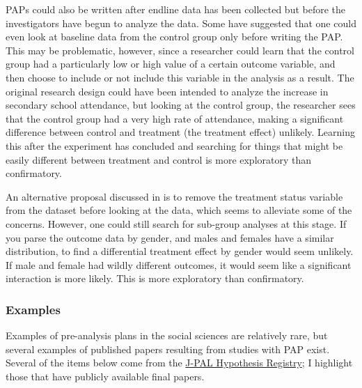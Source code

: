 \documentclass[12pt] {article}
\begin{document}
PAPs could also be written after endline data has been collected but before the investigators have begun to analyze the data. Some have suggested that one could even look at baseline data from the control group only before writing the PAP. This may be problematic, however, since a researcher could learn that the control group had a particularly low or high value of a certain outcome variable, and then choose to include or not include this variable in the analysis as a result. The original research design could have been intended to analyze the increase in secondary school attendance, but looking at the control group, the researcher sees that the control group had a very high rate of attendance, making a significant difference between control and treatment (the treatment effect) unlikely. Learning this after the experiment has concluded and searching for things that might be easily different between treatment and control is more exploratory than confirmatory. 

An alternative proposal discussed in \cite{OlkenPAP} is to remove the treatment status variable from the dataset before looking at the data, which seems to alleviate some of the concerns. However, one could still search for sub-group analyses at this stage. If you parse the outcome data by gender, and males and females have a similar distribution, to find a differential treatment effect by gender would seem unlikely. If male and female had wildly different outcomes, it would seem like a significant interaction is more likely. This is more exploratory than confirmatory. 


\subsubsection{Examples}\label{examples}
Examples of pre-analysis plans in the social sciences are relatively rare, but several examples of published papers resulting from studies with PAP exist. Several of the items below come from the \href{http://www.povertyactionlab.org/Hypothesis-Registry}{J-PAL Hypothesis Registry}; I highlight those that have publicly available final papers. 
\end{document}
